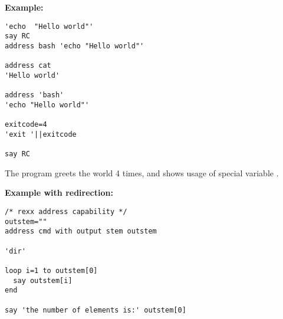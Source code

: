 \textbf{Example:}
\begin{lstlisting}
'echo  "Hello world"'
say RC
address bash 'echo "Hello world"'

address cat
'Hello world'

address 'bash'
'echo "Hello world"'

exitcode=4
'exit '||exitcode
 
say RC
\end{lstlisting}
The program greets the world 4 times, and shows usage of special variable .

\textbf{Example with redirection:}
\begin{lstlisting}
/* rexx address capability */
outstem=""
address cmd with output stem outstem

'dir'

loop i=1 to outstem[0]
  say outstem[i]
end

say 'the number of elements is:' outstem[0]
\end{lstlisting}

